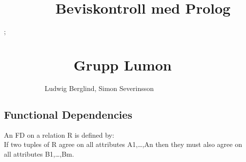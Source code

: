 \section{\texorpdfstring{\(~~~~~~~~~~~~~~~~~\)Beviskontroll med
Prolog}{\textasciitilde\textasciitilde\textasciitilde\textasciitilde\textasciitilde\textasciitilde\textasciitilde\textasciitilde\textasciitilde\textasciitilde\textasciitilde\textasciitilde\textasciitilde\textasciitilde\textasciitilde\textasciitilde\textasciitilde Beviskontroll med Prolog}}\label{beviskontroll-med-prolog}

;

\section{\texorpdfstring{\(~~~~~~~~~~~~~~~~~~~~~~~\)Grupp
Lumon}{\textasciitilde\textasciitilde\textasciitilde\textasciitilde\textasciitilde\textasciitilde\textasciitilde\textasciitilde\textasciitilde\textasciitilde\textasciitilde\textasciitilde\textasciitilde\textasciitilde\textasciitilde\textasciitilde\textasciitilde\textasciitilde\textasciitilde\textasciitilde\textasciitilde\textasciitilde\textasciitilde Grupp Lumon}}\label{grupp-lumon}

\(~~~~~~~~~~~~~~~~~~~~~~~~~~~\)Ludwig Berglind, Simon Severinsson

\pagebreak

\subsection{Functional Dependencies}\label{functional-dependencies}

An FD on a relation R is defined by:\\
If two tuples of R agree on all attributes A1,\ldots,An then they must
also agree on all attributes B1,\ldots,Bm.

